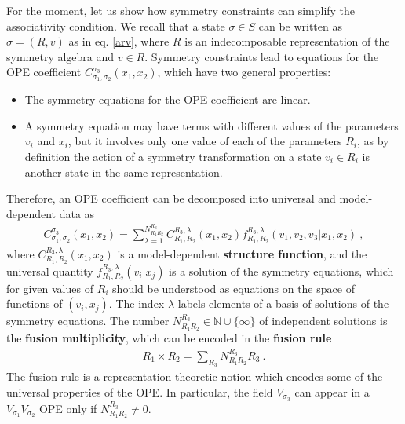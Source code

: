\documentclass[12pt, a4paper, notitlepage, twoside]{report}
\numberwithin{equation}{section}
\theoremstyle{break}
\begin{document}
For the moment, let us show how symmetry constraints can simplify the associativity condition.
We recall that a state $\sigma\in S$ can be written as $\sigma=(R,v)$ as in eq. \eqref{arv}, where $R$ is an indecomposable representation of the symmetry algebra and $v\in R$.
Symmetry constraints lead to equations for the OPE coefficient 
$C_{\sigma_1,\sigma_2}^{\sigma_3}(x_1,x_2)$, which have two general properties:
\begin{itemize}
 \item The symmetry equations for the OPE coefficient are linear.
\item A symmetry equation may have terms with different values of the parameters $v_i$ and $x_i$, but it involves only one value of each of the parameters $R_i$, as by definition the action of a symmetry transformation on a state $v_i\in R_i$ is another state in the same representation. 
\end{itemize}
Therefore, an OPE coefficient can be decomposed into universal and model-dependent data as
\begin{align}
 C_{\sigma_1,\sigma_2}^{\sigma_3}(x_1,x_2) = \sum_{\lambda=1}^{N_{R_1R_2}^{R_3}} C_{R_1,R_2}^{R_3,\lambda}(x_1,x_2) f_{R_1,R_2}^{R_3,\lambda}(v_1,v_2,v_3|x_1,x_2)\ ,
\label{clcf}
\end{align}
where $C_{R_1,R_2}^{R_3,\lambda}(x_1,x_2)$ is a model-dependent \textbf{\boldmath structure function}, and 
the universal quantity $f_{R_1,R_2}^{R_3,\lambda}(v_i|x_j)$ is a solution of the symmetry equations, which for given values of $R_i$ should be understood as equations on the space of functions of $(v_i,x_j)$.
The index $\lambda$ labels elements of a basis of solutions of the symmetry equations.
The number $N_{R_1R_2}^{R_3}\in {\mathbb{N}} \cup \{\infty\}$ of independent solutions is the \textbf{\boldmath fusion multiplicity}, which can be encoded in the \textbf{\boldmath fusion rule}
\begin{align}
 R_1 \times R_2  = \sum_{R_3} N_{R_1R_2}^{R_3} R_3 \ . 
\label{rrnr}
\end{align}
The fusion rule is a representation-theoretic notion which encodes some of the universal properties of the OPE.
In particular, the field $V_{\sigma_3}$ can appear in a $V_{\sigma_1}V_{\sigma_2}$ OPE only if $N_{R_1R_2}^{R_3}\neq 0$.
\end{document}
